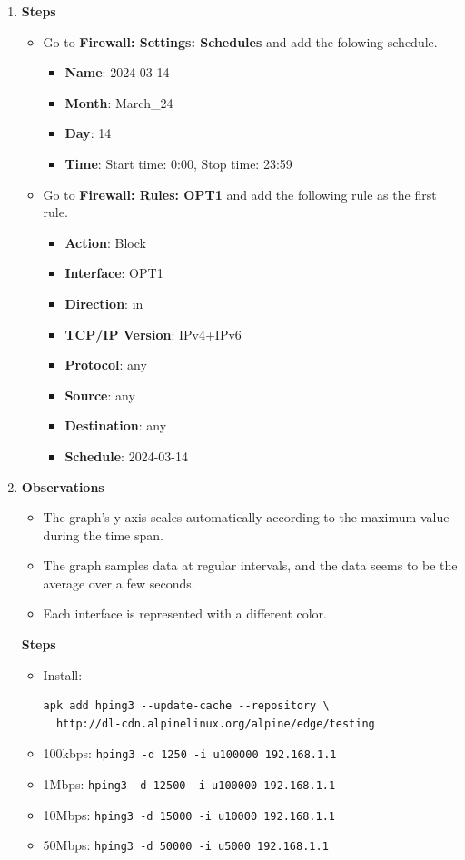 \documentclass[12pt, a4paper]{article}
\begin{document}
\begin{enumerate}[resume]
    \item
    \textbf{Steps}
    \begin{itemize}
      \item Go to \textbf{Firewall: Settings: Schedules} and add the folowing schedule.
      \begin{itemize}
        \item \textbf{Name}: 2024-03-14
        \item \textbf{Month}: March\_24
        \item \textbf{Day}: 14
        \item \textbf{Time}: Start time: 0:00, Stop time: 23:59
      \end{itemize}
      \item Go to \textbf{Firewall: Rules: OPT1} and add the following rule
      as the first rule.
      \begin{itemize}
          \item \textbf{Action}: Block
          \item \textbf{Interface}: OPT1
          \item \textbf{Direction}: in
          \item \textbf{TCP/IP Version}: IPv4+IPv6
          \item \textbf{Protocol}: any
          \item \textbf{Source}: any
          \item \textbf{Destination}: any
          \item \textbf{Schedule}: 2024-03-14
      \end{itemize}
    \end{itemize}

    \pagebreak
    \item \textbf{Observations}
    \begin{itemize}
      \item The graph's y-axis scales automatically according to the maximum
      value during the time span.
      \item The graph samples data at regular intervals, and the data seems
      to be the average over a few seconds.
      \item Each interface is represented with a different color.
    \end{itemize}


    \textbf{Steps}
    \begin{itemize}
      \item Install:
      \begin{verbatim}
apk add hping3 --update-cache --repository \
  http://dl-cdn.alpinelinux.org/alpine/edge/testing
      \end{verbatim}
      \item 100kbps: \verb|hping3 -d 1250 -i u100000 192.168.1.1|
      \item 1Mbps: \verb|hping3 -d 12500 -i u100000 192.168.1.1|
      \item 10Mbps: \verb|hping3 -d 15000 -i u10000 192.168.1.1|
      \item 50Mbps: \verb|hping3 -d 50000 -i u5000 192.168.1.1|
    \end{itemize}


\end{enumerate}
\end{document}
